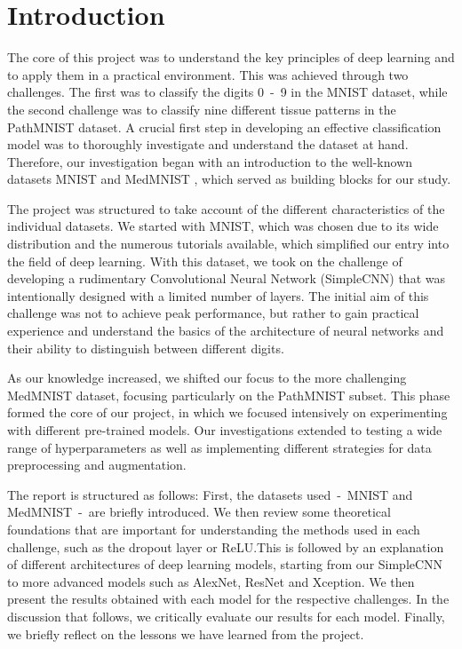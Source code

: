 \section{Introduction}\label{intro}

The core of this project was to understand the key principles of deep learning and to apply them in a practical environment. This was achieved through two challenges. The first was to classify the digits 0~-~9 in the MNIST dataset, while the second challenge was to classify nine different tissue patterns in the PathMNIST dataset. A crucial first step in developing an effective classification model was to thoroughly investigate and understand the dataset at hand. Therefore, our investigation began with an introduction to the well-known datasets MNIST \citep{deng2012mnist} and MedMNIST \citep{medmnistv1}, which served as building blocks for our study.

The project was structured to take account of the different characteristics of the individual datasets. We started with MNIST, which was chosen due to its wide distribution and the numerous tutorials available, which simplified our entry into the field of deep learning. With this dataset, we took on the challenge of developing a rudimentary Convolutional Neural Network (SimpleCNN) that was intentionally designed with a limited number of layers. The initial aim of this challenge was not to achieve peak performance, but rather to gain practical experience and understand the basics of the architecture of neural networks and their ability to distinguish between different digits.

As our knowledge increased, we shifted our focus to the more challenging MedMNIST dataset, focusing particularly on the PathMNIST subset. This phase formed the core of our project, in which we focused intensively on experimenting with different pre-trained models. Our investigations extended to testing a wide range of hyperparameters as well as implementing different strategies for data preprocessing and augmentation. 

The report is structured as follows: First, the datasets used~-~MNIST and MedMNIST~-~are briefly introduced. We then review some theoretical foundations that are important for understanding the methods used in each challenge, such as the dropout layer or ReLU.\@ This is followed by an explanation of different architectures of deep learning models, starting from our SimpleCNN to more advanced models such as AlexNet, ResNet and Xception. We then present the results obtained with each model for the respective challenges. In the discussion that follows, we critically evaluate our results for each model. Finally, we briefly reflect on the lessons we have learned from the project.


